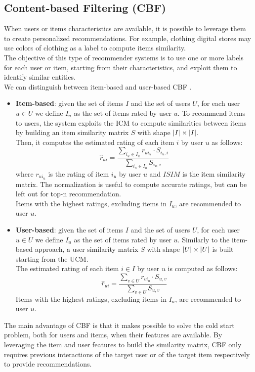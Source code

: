 \subsection{Content-based Filtering (CBF)}

When users or items characteristics are available, it is possible to leverage them to create personalized recommendations. For example, clothing digital stores may use colors of clothing as a label to compute items similarity.\\
The objective of this type of recommender systems is to use one or more labels for each user or item, starting from their characteristics, and exploit them to identify similar entities.\\
We can distinguish between item-based and user-based CBF \cite{10.1007/978-0-387-85820-3_1, 10.1007/978-3-540-72079-9_10}.
\begin{itemize}
\item \textbf{Item-based}: given the set of items $I$ and the set of users $U$, for each user $u \in U$ we define $I_u$ as the set of items rated by user $u$. To recommend items to users, the system exploits the ICM to compute similarities between items by building an item similarity matrix $S$ with shape $\left\lvert I\right\rvert \times \left\lvert I\right\rvert$.\\
Then, it computes the estimated rating of each item $i$ by user $u$ as follows:
\begin{equation*}
\hat{r}_{ui} = \frac{\sum_{i_u \in I_u} r_{ui_u} \cdot S_{i_u,i}}{\sum_{i_u \in I_u} S_{i_u,i}}
\end{equation*}
where $r_{ui_u}$ is the rating of item $i_u$ by user $u$ and $ISIM$ is the item similarity matrix. The normalization is useful to compute accurate ratings, but can be left out for top-n recommendation.\\
Items with the highest ratings, excluding items in $I_u$, are recommended to user $u$.
\item \textbf{User-based}: given the set of items $I$ and the set of users $U$, for each user $u \in U$ we define $I_u$ as the set of items rated by user $u$. Similarly to the item-based approach, a user similarity matrix $S$ with shape $\left\lvert U\right\rvert \times \left\lvert U\right\rvert$ is built starting from the UCM.\\
The estimated rating of each item $i \in I$ by user $u$ is computed as follows:
\begin{equation*}
\hat{r}_{ui} = \frac{\sum_{v \in U} r_{vi_u} \cdot S_{u,v}}{\sum_{v \in U} S_{u,v}}
\end{equation*}
Items with the highest ratings, excluding items in $I_u$, are recommended to user $u$.
\end{itemize}\par
The main advantage of CBF is that it makes possible to solve the cold start problem, both for users and items, when their features are available. By leveraging the item and user features to build the similarity matrix, CBF only requires previous interactions of the target user or of the target item respectively to provide recommendations.


